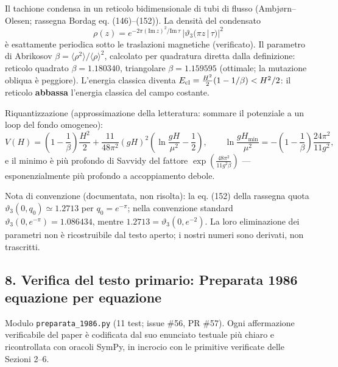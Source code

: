 \documentclass[
]{article}
\begin{document}
Il tachione condensa in un reticolo bidimensionale di tubi di flusso
(Ambjørn--Olesen; rassegna Bordag eq. (146)--(152)). La densità del
condensato
\[\rho(z) = e^{-2\pi(\mathrm{Im}\,z)^2/\mathrm{Im}\,\tau}\,|\vartheta_3(\pi z\,|\,\tau)|^2\]
è esattamente periodica sotto le traslazioni magnetiche (verificato). Il
parametro di Abrikosov
\(\beta = \langle\rho^2\rangle/\langle\rho\rangle^2\), calcolato per
quadratura diretta dalla definizione: reticolo quadrato
\(\beta = 1.180340\), triangolare \(\beta = 1.159595\) (ottimale; la
mutazione obliqua è peggiore). L'energia classica diventa
\(E_{\rm cl} = \tfrac{H^2}{2}(1 - 1/\beta) < H^2/2\): il reticolo
\textbf{abbassa} l'energia classica del campo costante.

Riquantizzazione (approssimazione della letteratura: sommare il
potenziale a un loop del fondo omogeneo):
\[V(H) = \left(1-\frac1\beta\right)\frac{H^2}{2} + \frac{11}{48\pi^2}(gH)^2\left(\ln\frac{gH}{\mu^2} - \frac12\right),\qquad \ln\frac{gH_{\min}}{\mu^2} = -\left(1-\frac1\beta\right)\frac{24\pi^2}{11g^2},\]
e il minimo è più profondo di Savvidy del fattore
\(\exp\left(\frac{48\pi^2}{11 g^2\beta}\right)\) --- esponenzialmente
più profondo a accoppiamento debole.

Nota di convenzione (documentata, non risolta): la eq. (152) della
rassegna quota \(\vartheta_3(0, q_0) \simeq 1.2713\) per
\(q_0 = e^{-\pi}\); nella convenzione standard
\(\vartheta_3(0, e^{-\pi}) = 1.086434\), mentre
\(1.2713 = \vartheta_3(0, e^{-2})\). La loro eliminazione dei parametri
non è ricostruibile dal testo aperto; i nostri numeri sono derivati, non
trascritti.

\hypertarget{verifica-del-testo-primario-preparata-1986-equazione-per-equazione}{%
\subsection{8. Verifica del testo primario: Preparata 1986 equazione per
equazione}\label{verifica-del-testo-primario-preparata-1986-equazione-per-equazione}}

Modulo \texttt{preparata\_1986.py} (11 test; issue \#56, PR \#57). Ogni
affermazione verificabile del paper è codificata dal suo enunciato
testuale più chiaro e ricontrollata con oracoli SymPy, in incrocio con
le primitive verificate delle Sezioni 2--6.
\end{document}
